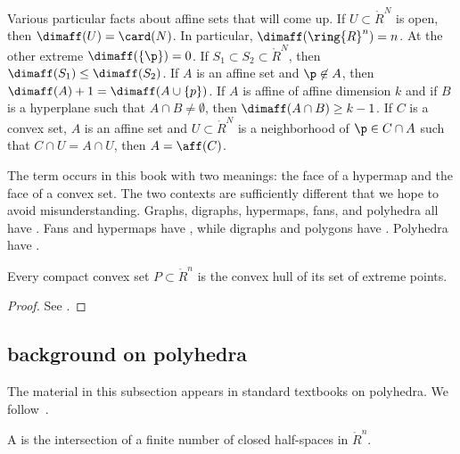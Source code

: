 \begin{remark}\label{rem:affine-background}
Various particular facts about affine sets that will come up.
If $U\subset\ring{R}^N$ is open, then $\dimaff(U) = \card(N)$.  In particular,
$\dimaff(\ring{R}^n) = n$.  At the other extreme $\dimaff(\{\p\}) = 0$.
If $S_1\subset S_2\subset\ring{R}^N$, then $\dimaff(S_1) \le \dimaff(S_2)$.
If $A$ is an affine set and $\p\not\in A$, then $\dimaff(A) +1 = \dimaff(A\cup\{p\})$.
If $A$ is affine of affine dimension $k$ and if $B$ is a hyperplane such that $A\cap B\ne\emptyset$, then $\dimaff (A\cap B)\ge k-1$.
If $C$ is a convex set, $A$ is an affine set and $U\subset \ring{R}^N$ 
is a neighborhood of $\p\in C\cap A$ such that $C\cap U = A\cap U$, then
$A=\aff(C)$.
\end{remark}


\begin{remark}\label{remark:face} 
The term  occurs in this book with two meanings: the
face of a hypermap and the face of a convex set.  The two contexts
are sufficiently different that we hope to avoid misunderstanding.
Graphs, digraphs, hypermaps, fans, and polyhedra all have .
Fans and hypermaps have , while digraphs and polygons 
have .  Polyhedra have .
\end{remark}

\begin{lemma} Every compact
convex set $P\subset\ring{R}^n$ is the convex hull of its set of
extreme points.
\end{lemma}

\begin{proof}  See \cite[Theorem~2.6.16]{webster:1994}.
\end{proof}

\subsection{background on polyhedra}


The material in this subsection appears in standard textbooks on polyhedra.
We follow~\cite{webster:1994}.

\begin{definition}[polyhedron]
A  is the
intersection of a finite number of closed half-spaces in
$\ring{R}^n$.  
\end{definition}
%

